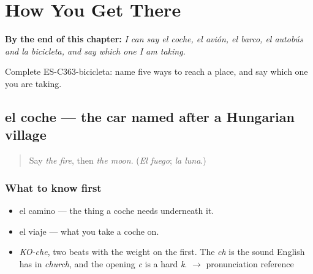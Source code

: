 
\chapter{How You Get There}
\label{ch:el-coche-y-el-avion}

\begin{chapteropening}
\textbf{By the end of this chapter:} \emph{I can say el coche, el avión, el barco, el autobús and la bicicleta, and say which one I am taking.}

Complete ES-C363-bicicleta: name five ways to reach a place, and say which one you are taking.
\end{chapteropening}

\section[el coche]{el coche — the car named after a Hungarian village}

\label{lesson:ES-C363-coche}



\begin{quote}
Say \emph{the fire}, then \emph{the moon}. (\emph{El fuego}; \emph{la luna}.)
\end{quote}

\subsection*{What to know first}
\begin{itemize}
\raggedright
  \item el camino — the thing a coche needs underneath it.
  \item el viaje — what you take a coche on.
\end{itemize}

\begin{sounds}
\begin{itemize}
\raggedright
  \item \emph{KO-che}, two beats with the weight on the first. The \emph{ch} is the sound English has in \emph{church}, and the opening \emph{c} is a hard \emph{k}. $\to$ pronunciation reference
\end{itemize}
\end{sounds}

